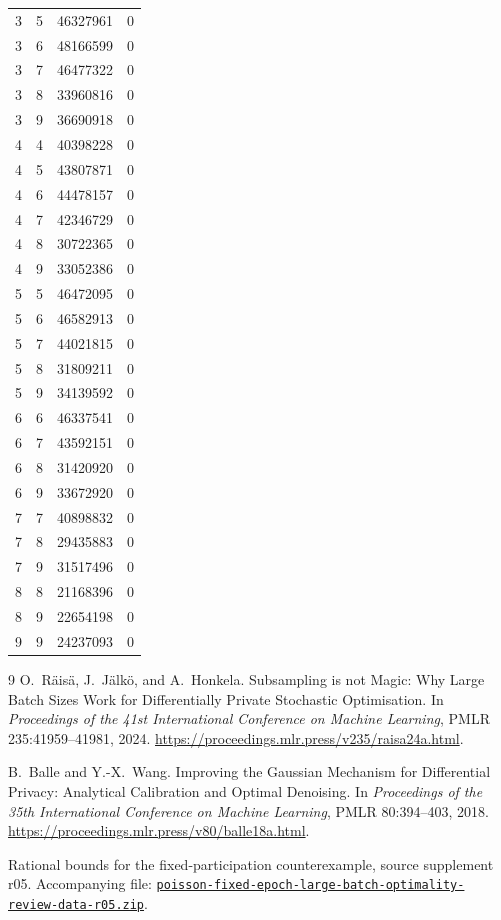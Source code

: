 \documentclass[11pt]{article}
\theoremstyle{remark}
\begin{document}
\begin{longtable}{@{}rrrr@{}}
3 & 5 & 46327961 & 0 \\
3 & 6 & 48166599 & 0 \\
3 & 7 & 46477322 & 0 \\
3 & 8 & 33960816 & 0 \\
3 & 9 & 36690918 & 0 \\
4 & 4 & 40398228 & 0 \\
4 & 5 & 43807871 & 0 \\
4 & 6 & 44478157 & 0 \\
4 & 7 & 42346729 & 0 \\
4 & 8 & 30722365 & 0 \\
4 & 9 & 33052386 & 0 \\
5 & 5 & 46472095 & 0 \\
5 & 6 & 46582913 & 0 \\
5 & 7 & 44021815 & 0 \\
5 & 8 & 31809211 & 0 \\
5 & 9 & 34139592 & 0 \\
6 & 6 & 46337541 & 0 \\
6 & 7 & 43592151 & 0 \\
6 & 8 & 31420920 & 0 \\
6 & 9 & 33672920 & 0 \\
7 & 7 & 40898832 & 0 \\
7 & 8 & 29435883 & 0 \\
7 & 9 & 31517496 & 0 \\
8 & 8 & 21168396 & 0 \\
8 & 9 & 22654198 & 0 \\
9 & 9 & 24237093 & 0 \\
\end{longtable}
\endgroup

\begin{thebibliography}{9}
O.~R\"ais\"a, J.~J\"alk\"o, and A.~Honkela.
\newblock Subsampling is not Magic: Why Large Batch Sizes Work for
Differentially Private Stochastic Optimisation.
\newblock In \emph{Proceedings of the 41st International Conference on
Machine Learning}, PMLR 235:41959--41981, 2024.
\newblock \url{https://proceedings.mlr.press/v235/raisa24a.html}.


B.~Balle and Y.-X.~Wang.
\newblock Improving the Gaussian Mechanism for Differential Privacy:
Analytical Calibration and Optimal Denoising.
\newblock In \emph{Proceedings of the 35th International Conference on
Machine Learning}, PMLR 80:394--403, 2018.
\newblock \url{https://proceedings.mlr.press/v80/balle18a.html}.


Rational bounds for the fixed-participation counterexample, source supplement r05.
\newblock Accompanying file:
\href{poisson-fixed-epoch-large-batch-optimality-review-data-r05.zip}{%
\nolinkurl{poisson-fixed-epoch-large-batch-optimality-review-data-r05.zip}}.

\end{thebibliography}
\end{document}
